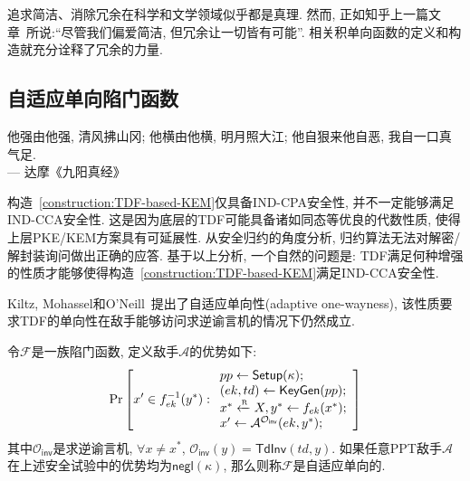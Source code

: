 \begin{note}
追求简洁、消除冗余在科学和文学领域似乎都是真理. 
然而, 正如知乎上一篇文章~\cite{zhihu-essay}所说:``尽管我们偏爱简洁, 但冗余让一切皆有可能''. 相关积单向函数的定义和构造就充分诠释了冗余的力量.
\end{note}

\subsection{自适应单向陷门函数}
\begin{center}
    他强由他强, 清风拂山冈; 他横由他横, 明月照大江; 他自狠来他自恶, 我自一口真气足. \\
                \hfill --- 达摩《九阳真经》
\end{center}



构造~\ref{construction:TDF-based-KEM}仅具备IND-CPA安全性, 并不一定能够满足IND-CCA安全性. 
这是因为底层的TDF可能具备诸如同态等优良的代数性质, 使得上层PKE/KEM方案具有可延展性. 
从安全归约的角度分析, 归约算法无法对解密/解封装询问做出正确的应答. 
基于以上分析, 一个自然的问题是: TDF满足何种增强的性质才能够使得构造~\ref{construction:TDF-based-KEM}满足IND-CCA安全性. 

Kiltz, Mohassel和O'Neill~\cite{KMO-EUROCRYPT-2010}提出了自适应单向性(adaptive one-wayness), 
该性质要求TDF的单向性在敌手能够访问求逆谕言机的情况下仍然成立. 
\begin{definition}[自适应单向性]
令$\mathcal{F}$是一族陷门函数, 定义敌手$\mathcal{A}$的优势如下:  
\begin{displaymath} 
\Pr \left[
x' \in f_{ek}^{-1}(y^*): 
\begin{array}{l}
    pp \leftarrow \mathsf{Setup}(\kappa);\\
    (ek, td) \leftarrow \mathsf{KeyGen}(pp);\\
    x^* \xleftarrow{\textup{\tiny R}} X, y^* \leftarrow f_{ek}(x^*);\\
    x' \leftarrow \mathcal{A}^{\mathcal{O}_\mathsf{inv}}(ek, y^*);
\end{array} 
\right]
\end{displaymath}
其中$\mathcal{O}_\mathsf{inv}$是求逆谕言机, $\forall x \neq x^*$, $\mathcal{O}_\mathsf{inv}(y) = \mathsf{TdInv}(td, y)$. 
如果任意PPT敌手$\mathcal{A}$在上述安全试验中的优势均为$\mathsf{negl}(\kappa)$, 
那么则称$\mathcal{F}$是自适应单向的.  
\end{definition}

